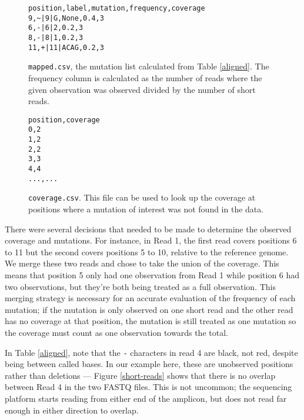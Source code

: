 \documentclass{article}
\begin{document}
\begin{figure}[h!]
\begin{verbatim}
position,label,mutation,frequency,coverage
9,~|9|G,None,0.4,3
6,-|6|2,0.2,3
8,-|8|1,0.2,3
11,+|11|ACAG,0.2,3
\end{verbatim}
\caption{\texttt{mapped.csv}, the mutation list calculated from Table \ref{aligned}. The frequency column is calculated as the number of reads where the given observation was observed divided by the number of short reads.}
\label{mapped}
\end{figure}

\begin{figure}[h!]
\begin{verbatim}
position,coverage
0,2
1,2
2,2
3,3
4,4
...,...
\end{verbatim}
\caption{\texttt{coverage.csv}. This file can be used to look up the coverage at positions where a mutation of interest was not found in the data.}
\label{coverage}
\end{figure}

There were several decisions that needed to be made to determine the observed coverage and mutations.
For instance, in Read 1, the first read covers positions 6 to 11 but the second covers positions 5 to 10, relative to the reference genome.
We merge these two reads and chose to take the union of the coverage.
This means that position 5 only had one observation from Read 1 while position 6 had two observations, but they're both being treated as a full observation.
This merging strategy is necessary for an accurate evaluation of the frequency of each mutation; if the mutation is only observed on one short read and the other read has no coverage at that position, the mutation is still treated as one mutation so the coverage must count as one observation towards the total.

In Table \ref{aligned}, note that the \texttt{-} characters in read 4 are black, not red, despite being between called bases.
In our example here, these are unobserved positions rather than deletions --- Figure \ref{short-reads} shows that there is no overlap between Read 4 in the two FASTQ files.
This is not uncommon; the sequencing platform starts reading from either end of the amplicon, but does not read far enough in either direction to overlap.
\end{document}
